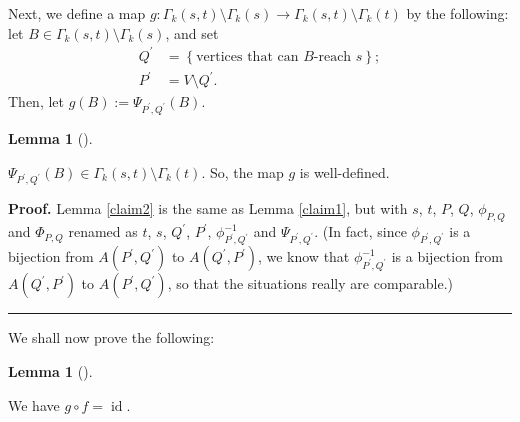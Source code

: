 \documentclass[numbers=enddot,12pt,final,onecolumn,notitlepage]{scrartcl}%
\theoremstyle{definition}
\newtheorem{lem}[theo]{Lemma}
\newenvironment{lemma}[1][]
{\begin{lem}[#1]\begin{leftbar}}
{\end{leftbar}\end{lem}}
\newenvironment{proof}[1][Proof]{\noindent\textbf{#1.} }{\ \rule{0.5em}{0.5em}}
\theoremstyle{plainsl}
\begin{document}
Next, we define a map $g: \Gamma_{k}(s,t) \setminus\Gamma_{k}(s) \to\Gamma
_{k}(s,t) \setminus\Gamma_{k}(t)$ by the following: let $B \in\Gamma_{k}(s,t)
\setminus\Gamma_{k}(s)$, and set%
\begin{align*}
Q^{\prime}  &  =\left\{  \text{vertices that can }B\text{-reach }s\right\}
;\\
P^{\prime}  &  =V\setminus Q^{\prime}.
\end{align*}
Then, let $g\left(  B\right)  :=\Psi_{P^{\prime},Q^{\prime}}\left(  B\right)
$.

\begin{lemma}
\label{claim2} $\Psi_{P^{\prime},Q^{\prime}}(B) \in\Gamma_{k}(s,t)
\setminus\Gamma_{k}(t)$. So, the map $g$ is well-defined.
\end{lemma}

\begin{proof}
Lemma \ref{claim2} is the same as Lemma \ref{claim1}, but with $s$, $t$, $P$,
$Q$, $\phi_{P,Q}$ and $\Phi_{P,Q}$ renamed as $t$, $s$, $Q^{\prime}$,
$P^{\prime}$, $\phi_{P^{\prime},Q^{\prime}}^{-1}$ and $\Psi_{P^{\prime
},Q^{\prime}}$. (In fact, since $\phi_{P^{\prime},Q^{\prime}}$ is a bijection
from $A\left(  P^{\prime},Q^{\prime}\right)  $ to $A\left(  Q^{\prime
},P^{\prime}\right)  $, we know that $\phi_{P^{\prime},Q^{\prime}}^{-1}$ is a
bijection from $A\left(  Q^{\prime},P^{\prime}\right)  $ to $A\left(
P^{\prime},Q^{\prime}\right)  $, so that the situations really are comparable.)
\end{proof}

We shall now prove the following:

\begin{lemma}
\label{claim3} We have $g\circ f=\operatorname*{id}$.
\end{lemma}
\end{document}
